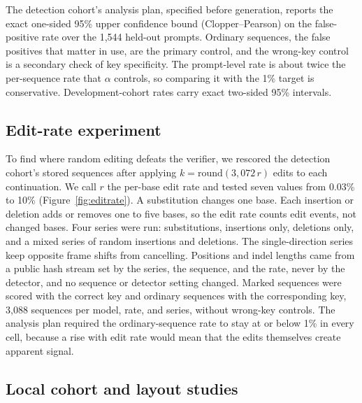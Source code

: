 \documentclass[10pt,twocolumn]{article}
\begin{document}
The detection cohort's analysis plan, specified before generation, reports the exact one-sided
95\% upper confidence bound (Clopper--Pearson) on the false-positive rate over the 1{,}544
held-out prompts. Ordinary sequences, the false positives that matter in use, are the primary control,
and the wrong-key control is a secondary check of key specificity. The prompt-level rate is about
twice the per-sequence rate that $\alpha$ controls, so comparing it with the 1\% target is
conservative. Development-cohort rates carry exact two-sided 95\% intervals.

\subsection{Edit-rate experiment}
\label{sec:edit-rate-methods}

To find where random editing defeats the verifier, we rescored the detection cohort's stored sequences
after applying $k = \mathrm{round}(3{,}072\,r)$ edits to each continuation. We call $r$ the
per-base edit rate and tested seven values from 0.03\% to 10\% (Figure~\ref{fig:editrate}). A
substitution changes one base. Each insertion or deletion adds or removes one to five bases, so the
edit rate counts edit events, not changed bases. Four series were run: substitutions, insertions
only, deletions only, and a mixed series of random insertions and deletions. The single-direction
series keep opposite frame shifts from cancelling. Positions and indel lengths came from a public
hash stream set by the series, the sequence, and the rate, never by the detector, and no sequence or
detector setting changed. Marked sequences were scored with the correct key and ordinary sequences with the
corresponding key, 3{,}088 sequences per model, rate, and series, without wrong-key controls. The
analysis plan required the ordinary-sequence rate to stay at or below 1\% in every cell, because a
rise with edit rate would mean that the edits themselves create apparent signal.

\subsection{Local cohort and layout studies}
\label{sec:local-methods}
\end{document}
